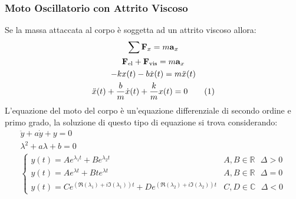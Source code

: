 \documentclass{article}
\newcommand{\vect}[1]{\boldsymbol{\mathbf{#1}}}
\numberwithin{equation}{subsection}
\begin{document}
\subsubsection{Moto Oscillatorio con Attrito Viscoso}
Se la massa attaccata al corpo è soggetta ad un attrito viscoso 
allora: 
\begin{gather*}
    \sum\vect{F}_x=m\vect{a}_x\\
    \vect{F}_{\mathrm{el}}+\vect{F}_\mathrm{vis}=m\vect{a}_x\\
    -kx(t)-b\dot x(t)=m\ddot x(t)\\
    \ddot x(t) +\displaystyle\frac{b}{m}\dot x(t) +\frac{k}{m}x(t)=0\tag{\stepcounter{equation}\theequation}
\end{gather*}
L'equazione del moto del corpo è un'equazione differenziale 
di secondo ordine e primo grado, la soluzione di questo tipo 
di equazione si trova considerando: 
\begin{gather*}
    \ddot y + a \dot y+y=0\\
    \lambda^{2}+a\lambda+b=0\\
    \begin{cases}
        \displaystyle y(t)=Ae^{\lambda_1t}+Be^{\lambda_2t}&A,B\in\mathbb{R}\:\:\:\Delta > 0\\
        \displaystyle y(t)=Ae^{\lambda t}+Bte^{\lambda t}&A,B\in\mathbb{R}\:\:\:\Delta = 0\\
        \displaystyle y(t)=Ce^{(\Re(\lambda_1)+i\Im(\lambda_1))t} + De^{(\Re(\lambda_2)+i\Im(\lambda_2))t}&C,D\in\mathbb{C}\:\:\:\Delta < 0
    \end{cases}
\end{gather*} 
\end{document}
